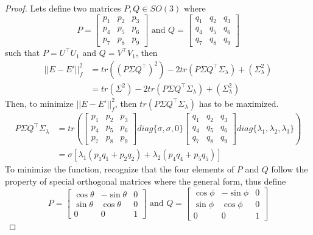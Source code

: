 \documentclass{article}
\begin{document}
\begin{proof}
    Lets define two matrices $P, Q \in SO(3)$ where
    $$P = \begin{bmatrix}
        p_1& p_2& p_3\\ p_4& p_5& p_6\\ p_7& p_8& p_9
    \end{bmatrix} \text{ and } Q = \begin{bmatrix}
        q_1& q_2& q_3\\ q_4& q_5& q_6\\ q_7& q_8& q_9
    \end{bmatrix}$$
    such that $P = U^\top U_1$ and $Q=V^\top V_1$, then
    \begin{align*}
        ||E-E'||_f^2 &= tr((P\Sigma Q^\top)^2) -2tr(P\Sigma Q^\top\Sigma_\lambda)+(\Sigma_\lambda^2)\\
        &= tr(\Sigma^2) -2tr(P\Sigma Q^\top\Sigma_\lambda)+(\Sigma_\lambda^2)
    \end{align*}
    Then, to minimize $||E-E'||_f^2$, then $tr(P\Sigma Q^\top\Sigma_\lambda)$ has to be maximized. 
    \begin{align*}
        P\Sigma Q^\top\Sigma_\lambda &= tr\left(\begin{bmatrix}
        p_1& p_2& p_3\\ p_4& p_5& p_6\\ p_7& p_8& p_9
    \end{bmatrix} diag\{\sigma, \sigma, 0\} \begin{bmatrix}
        q_1& q_2& q_3\\ q_4& q_5& q_6\\ q_7& q_8& q_9
    \end{bmatrix} diag\{\lambda_1, \lambda_2, \lambda_3\}\right)\\
    &= \sigma[\lambda_1(p_1q_1 + p_2q_2) + \lambda_2(p_4q_4+p_5q_5)]
    \end{align*}
    To minimize the function, recognize that the four elements of $P$ and $Q$ follow the property of special orthogonal matrices where the general form, thus define 
        $$P = \begin{bmatrix}
        \cos\theta & -\sin \theta & 0\\ \sin \theta& \cos \theta& 0\\ 0 & 0 & 1
    \end{bmatrix} \text{ and } Q = \begin{bmatrix}
        \cos\phi& -\sin \phi& 0\\ \sin \phi& \cos \phi & 0 \\ 0 & 0 & 1
    \end{bmatrix}$$

\end{proof}
\end{document}
